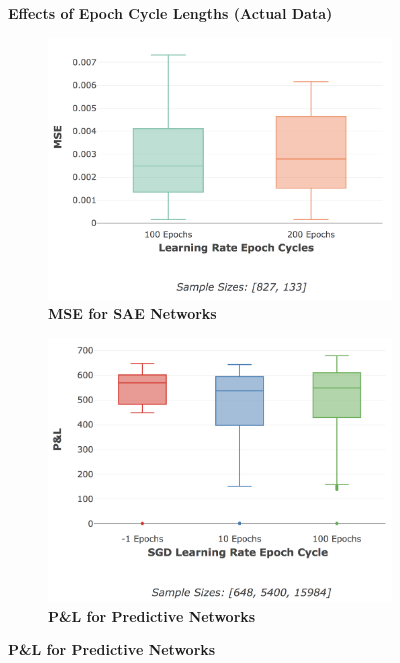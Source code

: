 \documentclass[a4paper,11pt,oneside]{article}
\theoremstyle{plain}
\theoremstyle{definition}
\begin{document}
\begin{figure}[H]
	\centering
	\textbf{Effects of Epoch Cycle Lengths (Actual Data)}
	\begin{subfigure}{.5\textwidth}
		\centering 
		\includegraphics[scale=0.3]{images/results/network/lr/actual_mse_lr_epochs.png}
		\caption{\textbf{MSE for SAE Networks} 
			\newline }
		\label{figure-actual_mse_lr_epochs}
	\end{subfigure}%
	\begin{subfigure}{.5\textwidth}
		\centering 
		\includegraphics[scale=0.3]{images/results/network/lr/actual_pl_lr_epochs.png}
		\caption{\textbf{P\&L for Predictive Networks} 
}
\end{subfigure}
\end{figure}
\end{document}
